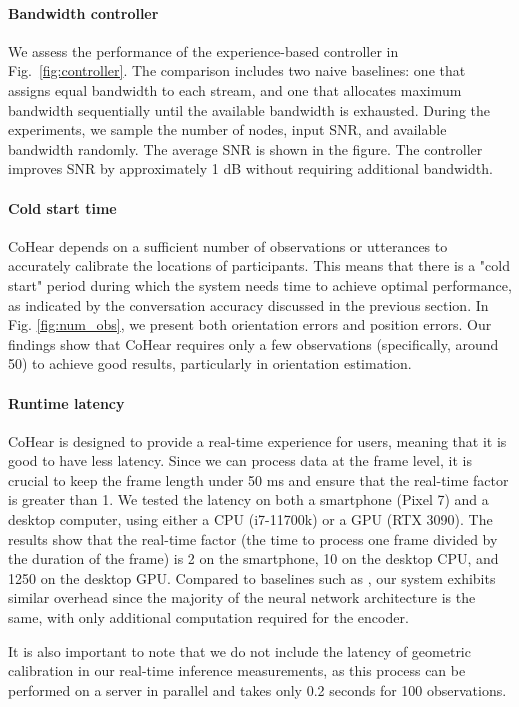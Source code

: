 \paragraph{Bandwidth controller}
We assess the performance of the experience-based controller in Fig.~\ref{fig:controller}. The comparison includes two naive baselines: one that assigns equal bandwidth to each stream, and one that allocates maximum bandwidth sequentially until the available bandwidth is exhausted. During the experiments, we sample the number of nodes, input SNR, and available bandwidth randomly. The average SNR is shown in the figure. The controller improves SNR by approximately 1 dB without requiring additional bandwidth.

\paragraph{Cold start time}
CoHear depends on a sufficient number of observations or utterances to accurately calibrate the locations of participants. This means that there is a "cold start" period during which the system needs time to achieve optimal performance, as indicated by the conversation accuracy discussed in the previous section.
In Fig. \ref{fig:num_obs}, we present both orientation errors and position errors. Our findings show that CoHear requires only a few observations (specifically, around 50) to achieve good results, particularly in orientation estimation.


\paragraph{Runtime latency}
CoHear is designed to provide a real-time experience for users, meaning that it is good to have less latency. Since we can process data at the frame level, it is crucial to keep the frame length under 50 ms and ensure that the real-time factor is greater than 1.
We tested the latency on both a smartphone (Pixel 7) and a desktop computer, using either a CPU (i7-11700k) or a GPU (RTX 3090). The results show that the real-time factor (the time to process one frame divided by the duration of the frame) is 2 on the smartphone, 10 on the desktop CPU, and 1250 on the desktop GPU. Compared to baselines such as \cite{veluri2024look}, our system exhibits similar overhead since the majority of the neural network architecture is the same, with only additional computation required for the encoder.

It is also important to note that we do not include the latency of geometric calibration in our real-time inference measurements, as this process can be performed on a server in parallel and takes only 0.2 seconds for 100 observations.


